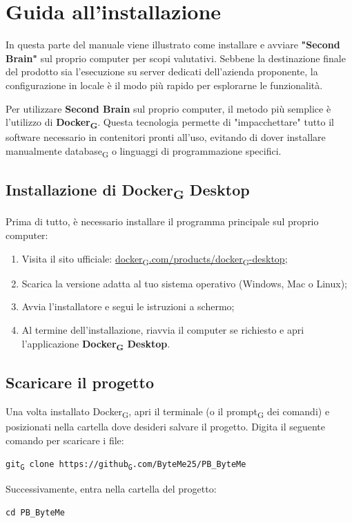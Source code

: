 \documentclass[11pt,a4paper]{article}
\newcommand{\gls}[1]{#1\textsubscript{G}}
\begin{document}
\section{Guida all'installazione}
In questa parte del manuale viene illustrato come installare e avviare \textbf{"Second Brain"} sul proprio computer per scopi valutativi. Sebbene la destinazione finale del prodotto sia l'esecuzione su server dedicati dell'azienda proponente, la configurazione in locale è il modo più rapido per esplorarne le funzionalità.

Per utilizzare \textbf{Second Brain} sul proprio computer, il metodo più semplice è l'utilizzo di \textbf{\gls{Docker}}. Questa tecnologia permette di "impacchettare" tutto il software necessario in contenitori pronti all'uso, evitando di dover installare manualmente \gls{database} o linguaggi di programmazione specifici.

\subsection{Installazione di \gls{Docker} Desktop}
Prima di tutto, è necessario installare il programma principale sul proprio computer:
\begin{enumerate}
    \item Visita il sito ufficiale: \href{https://www.docker.com/products/docker-desktop/}{\gls{docker}.com/products/\gls{docker}-desktop};
    \item Scarica la versione adatta al tuo sistema operativo (Windows, Mac o Linux);
    \item Avvia l'installatore e segui le istruzioni a schermo;
    \item Al termine dell'installazione, riavvia il computer se richiesto e apri l'applicazione \textbf{\gls{Docker} Desktop}.
\end{enumerate}

\subsection{Scaricare il progetto}
Una volta installato \gls{Docker}, apri il terminale (o il \gls{prompt} dei comandi) e posizionati nella cartella dove desideri salvare il progetto. Digita il seguente comando per scaricare i file:
\begin{center}
    \texttt{\gls{git} clone https://\gls{github}.com/ByteMe25/PB\_ByteMe}
\end{center}
Successivamente, entra nella cartella del progetto:
\begin{center}
    \texttt{cd PB\_ByteMe}
\end{center}
\end{document}
